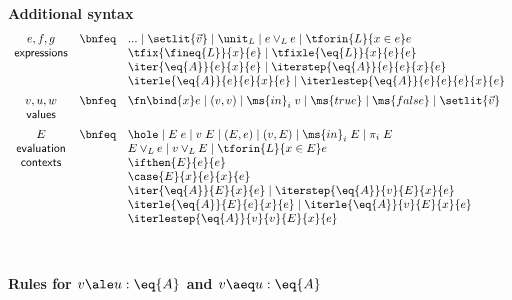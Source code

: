 \begin{figure*}
  \centering

  \begin{minipage}{0.5\textwidth}
    \centering
    \textbf{Additional syntax}
    \begin{displaymath}
      \begin{array}{ccl}
        e,f,g
        &\bnfeq& ... \pipe \setlit{\vec{v}} \pipe \unit_L \pipe e \vee_L e \pipe \tforin{L}{x \in e} e\\
        \textsf{expressions}
        && \tfix{\fineq{L}}{x}{e} \pipe \tfixle{\eq{L}}{x}{e}{e}\\
        && \iter{\eq{A}}{e}{x}{e} \pipe \iterstep{\eq{A}}{e}{e}{x}{e}\\
        && \iterle{\eq{A}}{e}{e}{x}{e} \pipe \iterlestep{\eq{A}}{e}{e}{e}{x}{e}
        \vspace{0.5em}\\
        v,u,w
        &\bnfeq& \fn\bind{x} e \pipe (v, v) \pipe \ms{in}_i\; v
        \pipe \ms{true} \pipe \ms{false} \pipe \setlit{\vec{v}}\\
        \textsf{values}
        \vspace{0.5em}\\
        E
        &\bnfeq& \hole \pipe E\;e \pipe v\;E \pipe (E, e) \pipe (v, E) \pipe \ms{in}_i\;E
        \pipe \pi_i \; E\\
        \textsf{evaluation}
        && E \vee_L e \pipe v \vee_L E \pipe \tforin{L}{x \in E} e\\
        \textsf{contexts}
        && \ifthen{E}{e}{e}\\
        && \case{E}{x}{e}{x}{e}\\
        && \iter{\eq{A}}{E}{x}{e} \pipe \iterstep{\eq{A}}{v}{E}{x}{e}\\
        && \iterle{\eq{A}}{E}{e}{x}{e} \pipe \iterle{\eq{A}}{v}{E}{x}{e}\\
        && \iterlestep{\eq{A}}{v}{v}{E}{x}{e}
      \end{array}
    \end{displaymath}
  \end{minipage}
  ~
  \begin{minipage}{0.45\textwidth}
    \centering
    \textbf{Rules for $v \ale u : \eq{A}$ and $v \aeq u : \eq{A}$}
    \begin{mathpar}

\end{mathpar}
\end{minipage}
\end{figure*}
